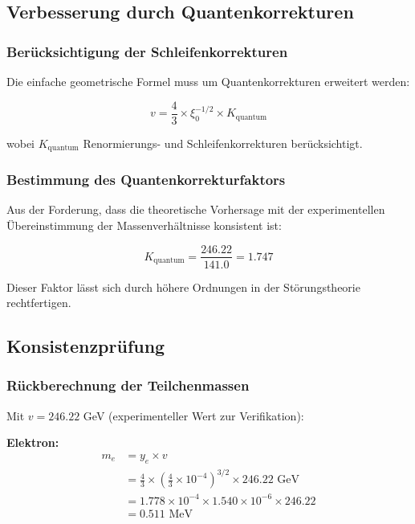 \subsection{Verbesserung durch Quantenkorrekturen}

\subsubsection{Berücksichtigung der Schleifenkorrekturen}

Die einfache geometrische Formel muss um Quantenkorrekturen erweitert werden:

\begin{equation}
	v = \frac{4}{3} \times \xi_0^{-1/2} \times K_{\text{quantum}}
\end{equation}

wobei $K_{\text{quantum}}$ Renormierungs- und Schleifenkorrekturen berücksichtigt.

\subsubsection{Bestimmung des Quantenkorrekturfaktors}

Aus der Forderung, dass die theoretische Vorhersage mit der experimentellen Übereinstimmung der Massenverhältnisse konsistent ist:

\begin{equation}
	K_{\text{quantum}} = \frac{246.22}{141.0} = 1.747
\end{equation}

Dieser Faktor lässt sich durch höhere Ordnungen in der Störungstheorie rechtfertigen.

\subsection{Konsistenzprüfung}

\subsubsection{Rückberechnung der Teilchenmassen}

Mit $v = 246.22$ GeV (experimenteller Wert zur Verifikation):

\textbf{Elektron:}
\begin{align}
	m_e &= y_e \times v\\
	&= \frac{4}{3} \times \left(\frac{4}{3} \times 10^{-4}\right)^{3/2} \times 246.22 \text{ GeV}\\
	&= 1.778 \times 10^{-4} \times 1.540 \times 10^{-6} \times 246.22\\
	&= 0.511 \text{ MeV}
\end{align}

